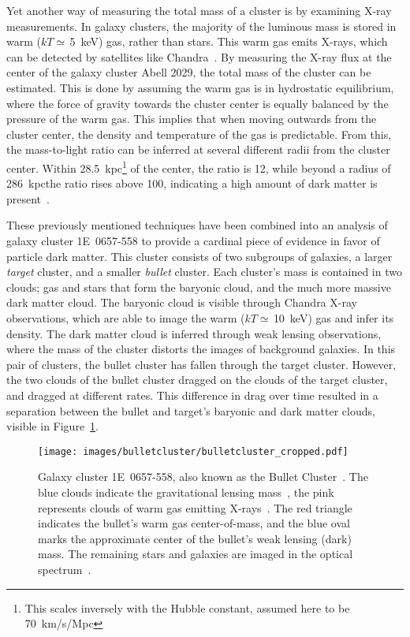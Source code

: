 Yet another way of measuring the total mass of a cluster is by examining X-ray measurements.
In galaxy clusters, the majority of the luminous mass is stored in warm ($kT\simeq\,$\SI{5}{keV}) gas, rather than stars.
This warm gas emits X-rays, which can be detected by satellites like Chandra~\cite{chandra}.
By measuring the X-ray flux at the center of the galaxy cluster Abell 2029, the total mass of the cluster can be estimated.
This is done by assuming the warm gas is in hydrostatic equilibrium, where the force of gravity towards the cluster center is equally balanced by the pressure of the warm gas.
This implies that when moving outwards from the cluster center, the density and temperature of the gas is predictable.
From this, the mass-to-light ratio can be inferred at several different radii from the cluster center.
Within \SI{28.5}{kpc}\footnote[2]{This scales inversely with the Hubble constant, assumed here to be \SI{70}{km/s/Mpc}} of the center, the ratio is \SI{12}{}, while beyond a radius of \SI{286}{kpc}\footnotemark[2] the ratio rises above \SI{100}{}, indicating a high amount of dark matter is present~\cite{cluster_chandra}.

These previously mentioned techniques have been combined into an analysis of galaxy cluster \mbox{1E 0657-558} to provide a cardinal piece of evidence in favor of particle dark matter.
This cluster consists of two subgroups of galaxies, a larger \textit{target} cluster, and a smaller \textit{bullet} cluster.
Each cluster's mass is contained in two clouds; gas and stars that form the baryonic cloud, and the much more massive dark matter cloud.
The baryonic cloud is visible through Chandra X-ray observations, which are able to image the warm ($kT\simeq\,$\SI{10}{keV}) gas and infer its density.
The dark matter cloud is inferred through weak lensing observations, where the mass of the cluster distorts the images of background galaxies.
In this pair of clusters, the bullet cluster has fallen through the target cluster.
However, the two clouds of the bullet cluster dragged on the clouds of the target cluster, and dragged at different rates.
This difference in drag over time resulted in a separation between the bullet and target's baryonic and dark matter clouds, visible in Figure~\ref{fig:bullet}.

\begin{figure}[!ht]
  \centering
  \texttt{[image: images/bulletcluster/bulletcluster\_cropped.pdf]}
  \caption[The Bullet Cluster]{
    Galaxy cluster \mbox{1E 0657-558}, also known as the Bullet Cluster~\cite{bullet_cluster_combined_image}.
    The blue clouds indicate the gravitational lensing mass~\cite{bullet_cluster}, the pink represents clouds of warm gas emitting X-rays~\cite{bullet_cluster_chandramap}.
    The red triangle indicates the bullet's warm gas center-of-mass, and the blue oval marks the approximate center of the bullet's weak lensing (dark) mass.
    The remaining stars and galaxies are imaged in the optical spectrum~\cite{bullet_cluster_composite}.}
  \label{fig:bullet}
\end{figure}
    
